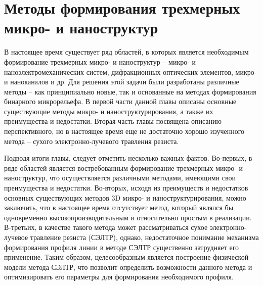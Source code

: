 \chapter{Методы формирования трехмерных микро- и наноструктур}

В настоящее время существует ряд областей, в которых является необходимым формирование трехмерных микро- и наноструктур -- микро- и наноэлектромеханических систем, дифракционных оптических элементов, микро- и наноканалов и др. Для решения этой задачи были разработаны различные методы -- как принципиально новые, так и основанные на методах формирования бинарного микрорельефа. В первой части данной главы описаны основные существующие методы микро- и наноструктурирования, а также их преимущества и недостатки. Вторая часть главы посвящена описанию перспективного, но в настоящее время еще не достаточно хорошо изученного метода -- сухого электронно-лучевого травления резиста.




Подводя итоги главы, следует отметить несколько важных фактов. Во-первых, в ряде областей является востребованным формирование трехмерных микро- и наноструктур, что осуществляется различными методами, имеющими свои преимущества и недостатки. Во-вторых, исходя из преимуществ и недостатков основных существующих методов 3D микро- и наноструктурирования, можно заключить, что в настоящее время отсутствует метод, который являлся бы одновременно высокопроизводительным и относительно простым в реализации. В-третьих, в качестве такого метода может рассматриваться сухое электронно-лучевое травление резиста (СЭЛТР), однако, недостаточное понимание механизма формирования профиля линии в методе СЭЛТР существенно затрудняет его применение. Таким образом, целесообразным является построение физической модели метода СЭЛТР, что позволит определить возможности данного метода и оптимизировать его параметры для формирования необходимого профиля.
